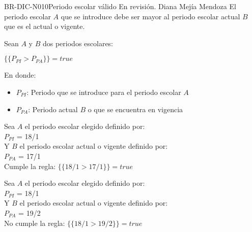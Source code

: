 \begin{BusinessRule}{BR-DIC-N010}{Periodo escolar válido}
	{\bcCondition}    %
	{\btEnabler}     %
	{\blControlling}    %
	\BRItem[Estado] En revisión.
	 Diana Mejía Mendoza
	\BRItem[Descripción] El periodo escolar $A$ que se introduce debe ser mayor al periodo escolar actual $B$ que es el actual o vigente.
	
	\BRItem[Sentencia] Sean $A$ y $B$ dos periodos escolares:
	\begin{center}
		$ \{ \{P_{PI} > P_{PA} \} \} = true$ 
	\end{center}
	
	En donde:
	\begin{itemize}
		\item $P_{PI}$: Periodo que se introduce para el periodo escolar $A$
		\item $P_{PA}$: Periodo actual $B$ o que se encuentra en vigencia 		
	\end{itemize} 
	
	
	Sea $A$ el periodo escolar elegido definido por: \\
	$P_{PI}$ = 18/1\\
	Y $B$ el periodo escolar actual o vigente definido por:\\
	$P_{PA}$ = 17/1\\
	
	Cumple la regla:
	$ \{ \{18/1 > 17/1 \}\} = true$ 
	
	Sea $A$ el periodo escolar elegido definido por: \\
	$P_{PI}$ = 18/1\\
	Y $B$ el periodo escolar actual o vigente definido por:\\
	$P_{PA}$ = 19/2\\
	
	No cumple la regla:
	$ \{ \{18/1 > 19/2 \} \} = true$ 
	
	
\end{BusinessRule}

